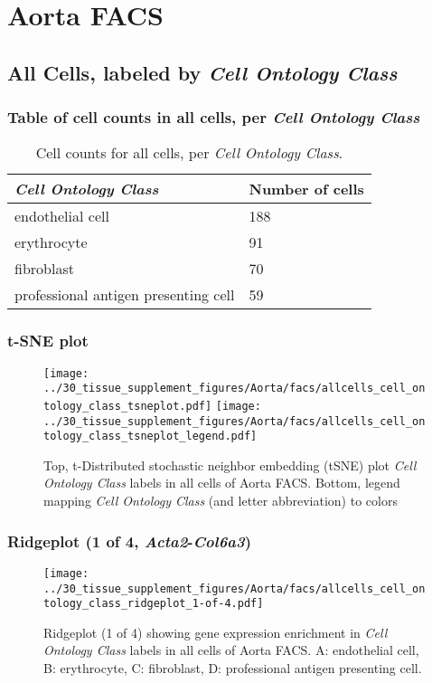 \clearpage
\section{Aorta FACS}

\subsection{All Cells, labeled by \emph{Cell Ontology Class}}
\subsubsection{Table of cell counts in all cells, per \emph{Cell Ontology Class}}\begin{table}[h]
\centering
\label{my-label}
\begin{tabular}{@{}ll@{}}
\toprule

\emph{Cell Ontology Class}& Number of cells \\ \midrule
endothelial cell & 188 \\

erythrocyte & 91 \\

fibroblast & 70 \\

professional antigen presenting cell & 59 \\
\bottomrule
\end{tabular}
\caption{Cell counts for all cells, per \emph{Cell Ontology Class}.}
\end{table}

\clearpage
\subsubsection{t-SNE plot}
\begin{figure}[h]
\centering
\texttt{[image: ../30\_tissue\_supplement\_figures/Aorta/facs/allcells\_cell\_ontology\_class\_tsneplot.pdf]}
\texttt{[image: ../30\_tissue\_supplement\_figures/Aorta/facs/allcells\_cell\_ontology\_class\_tsneplot\_legend.pdf]}
\caption{Top, t-Distributed stochastic neighbor embedding (tSNE) plot  \emph{Cell Ontology Class} labels in all cells of Aorta FACS. Bottom, legend mapping \emph{Cell Ontology Class} (and letter abbreviation) to colors}
\end{figure}


\clearpage

\subsubsection{Ridgeplot (1 of 4, \emph{Acta2}-\emph{Col6a3})}
\begin{figure}[h]
\centering
\texttt{[image: ../30\_tissue\_supplement\_figures/Aorta/facs/allcells\_cell\_ontology\_class\_ridgeplot\_1-of-4.pdf]}

\caption{ Ridgeplot (1 of 4)  showing gene expression enrichment in \emph{Cell Ontology Class} labels in all cells of Aorta FACS. A: endothelial cell, B: erythrocyte, C: fibroblast, D: professional antigen presenting cell.}
\end{figure}


